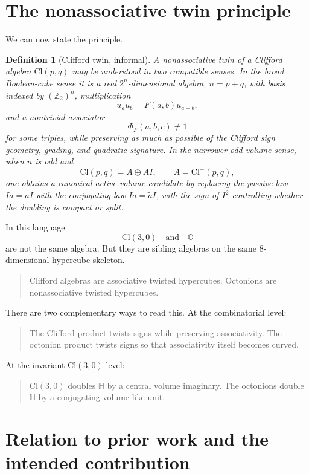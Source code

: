 \documentclass[11pt]{article}
\newtheorem{definition}{Definition}
\newcommand{\Ztwo}{\mathbb Z_2}
\newcommand{\Cl}{\mathrm{Cl}}
\newcommand{\OO}{\mathbb O}
\newcommand{\assoc}{\Phi}
\begin{document}
\section{The nonassociative twin principle}

We can now state the principle.

\begin{definition}[Clifford twin, informal]
A nonassociative twin of a Clifford algebra $\Cl(p,q)$ may be understood
in two compatible senses. In the broad Boolean-cube sense it is a real
$2^n$-dimensional algebra, $n=p+q$, with basis indexed by $(\Ztwo)^n$,
multiplication
\[
u_a u_b = F(a,b)u_{a+b},
\]
and a nontrivial associator
\[
\assoc_F(a,b,c)\neq 1
\]
for some triples, while preserving as much as possible of the Clifford sign
geometry, grading, and quadratic signature. In the narrower odd-volume sense,
when $n$ is odd and
\[
\Cl(p,q)=A\oplus AI,
\qquad A=\Cl^+(p,q),
\]
one obtains a canonical active-volume candidate by replacing the passive law
$Ia=aI$ with the conjugating law $Ia=\widetilde aI$, with the sign of $I^2$
controlling whether the doubling is compact or split.
\end{definition}

In this language:
\[
\Cl(3,0)
\quad\text{and}\quad
\OO
\]
are not the same algebra. But they are sibling algebras on the same
$8$-dimensional hypercube skeleton.

\begin{quote}
Clifford algebras are associative twisted hypercubes.
Octonions are nonassociative twisted hypercubes.
\end{quote}

There are two complementary ways to read this. At the combinatorial level:

\begin{quote}
The Clifford product twists signs while preserving associativity.
The octonion product twists signs so that associativity itself becomes curved.
\end{quote}

At the invariant $\Cl(3,0)$ level:

\begin{quote}
$\Cl(3,0)$ doubles $\mathbb H$ by a central volume imaginary.
The octonions double $\mathbb H$ by a conjugating volume-like unit.
\end{quote}



\section{Relation to prior work and the intended contribution}
\end{document}
